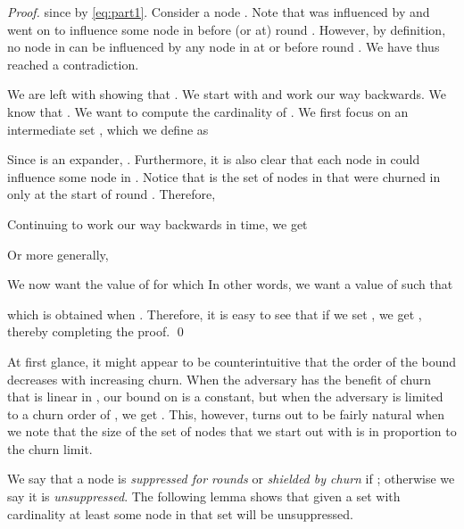 \documentclass[leqno,11pt]{article}
\begin{document}
{\begin{proof}
since  by
\eqref{eq:part1}. Consider a node
. Note that  was influenced by  and went
on to influence some node in  before (or at) round . However, by definition, no node  in  can be influenced by any node in  at or before round . We have thus reached a contradiction. 

We are left with showing that .
We start with  and work our way backwards. We know that . We want to compute the cardinality of . We
first focus on an intermediate set , which we define as 
 
Since  is an expander, . 
Furthermore, it is also clear that each node in  could influence some node in . 
Notice that  is the set of nodes in  that were churned in only at the start of round . 
Therefore, 

Continuing to work our way backwards in time, we get

Or more generally,

We now want the value of  for which  In other words, we want a value of  such that

which is obtained when . Therefore, it is
easy to see that if we set , we get , thereby completing the proof. 
\qed
\end{proof}
}
At  first glance, it might appear to be counterintuitive that the order of the
bound  decreases with increasing churn. When the adversary has the benefit of churn that is linear in , our bound on  is a constant, but when the adversary is limited to a churn order of , we get 
. This, however, turns out to be fairly
natural when we note that the size of the set  of nodes that we start out with is in proportion to the churn limit.

We say that a node  is \emph{suppressed for  rounds} or \emph{shielded by churn} if ; otherwise we say it is \emph{unsuppressed}. The following lemma shows
that given a set with cardinality at least  some node in that set will be
unsuppressed. 
\end{document}
